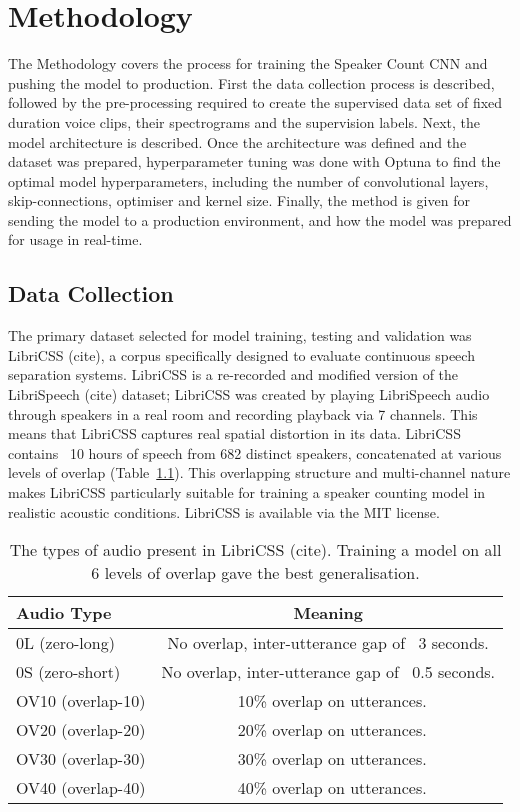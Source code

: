 
\chapter{Methodology}
The Methodology covers the process for training the Speaker Count CNN and pushing the model to production. First the data collection process is described, followed by the pre-processing required to create the supervised data set of fixed duration voice clips, their spectrograms and the supervision labels. Next, the model architecture is described. Once the architecture was defined and the dataset was prepared, hyperparameter tuning was done with Optuna to find the optimal model hyperparameters, including the number of convolutional layers, skip-connections, optimiser and kernel size. Finally, the method is given for sending the model to a production environment, and how the model was prepared for usage in real-time.

\section{Data Collection}
The primary dataset selected for model training, testing and validation was LibriCSS (cite), a corpus specifically designed to evaluate continuous speech separation systems. LibriCSS is a re-recorded and modified version of the LibriSpeech (cite) dataset; LibriCSS was created by playing LibriSpeech audio through speakers in a real room and recording playback via 7 channels. This means that LibriCSS captures real spatial distortion in its data. LibriCSS contains ~10 hours of speech from 682 distinct speakers, concatenated at various levels of overlap (Table~\ref{tab:LibriCSS}). This overlapping structure and multi-channel nature makes LibriCSS particularly suitable for training a speaker counting model in realistic acoustic conditions. LibriCSS is available via the MIT license.

\begin{table}[H]
  \centering
  \caption{The types of audio present in LibriCSS (cite). Training a model on all 6 levels of overlap gave the best generalisation.}
  \label{tab:LibriCSS}
  \begin{tabular}{|l|c|}
    \hline
    \textbf{Audio Type} & \textbf{Meaning} \\
    \hline
    0L (zero-long) & No overlap, inter-utterance gap of ~3 seconds. \\
    \hline
    0S (zero-short) & No overlap, inter-utterance gap of ~0.5 seconds. \\
    \hline
    OV10 (overlap-10) & ~10\% overlap on utterances. \\
    \hline
    OV20 (overlap-20) & ~20\% overlap on utterances. \\
    \hline
    OV30 (overlap-30) & ~30\% overlap on utterances. \\
    \hline
    OV40 (overlap-40) & ~40\% overlap on utterances. \\
    \hline
  \end{tabular}
\end{table}

